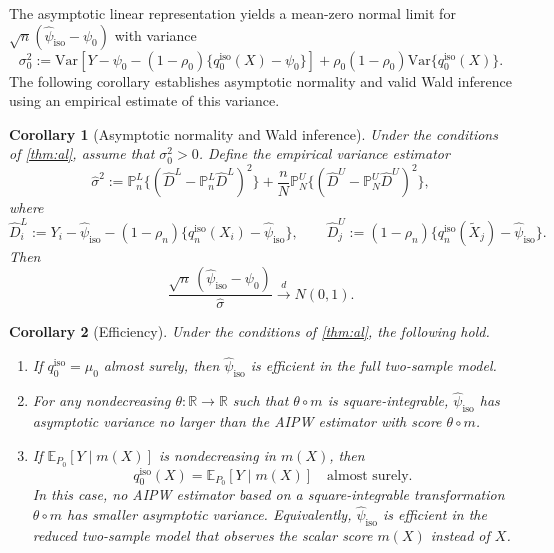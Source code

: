 \documentclass{article}
\theoremstyle{plain}
\newtheorem{corollary}{Corollary}
\theoremstyle{definition}
\newcommand{\E}{\mathbb{E}}
\newcommand{\Var}{\mathrm{Var}}
\newcommand{\1}{\mathbf{1}}
\newcommand{\mhat}{m}
\newcommand{\rhozero}{\rho_0}
\newcommand{\rhon}{\rho_n}
\newcommand{\muzero}{\mu_0}
\newcommand{\Pl}{\mathbb{P}^{L}_n}
\newcommand{\Pu}{\mathbb{P}^{U}_N}
\begin{document}
The asymptotic linear representation yields a mean-zero
normal limit for
$\sqrt n(\widehat{\psi}_{\mathrm{iso}}-\psi_0)$ with variance
\[
\sigma_0^2
:=
\Var\!\left[
Y-\psi_0-(1-\rhozero)\{q_0^{\mathrm{iso}}(X)-\psi_0\}
\right]
+
\rhozero(1-\rhozero)\Var\{q_0^{\mathrm{iso}}(X)\}.
\]
The following corollary establishes asymptotic normality
and valid Wald inference using an empirical estimate of
this variance.

\begin{corollary}[Asymptotic normality and Wald inference]
\label{cor:normal}
Under the conditions of \cref{thm:al}, assume that
$\sigma_0^2>0$. Define the empirical variance estimator
\[
\widehat \sigma^2
:=
\Pl\{(\widehat D^L-\Pl\widehat D^L)^2\}
+
\frac{n}{N}\Pu\{(\widehat D^U-\Pu\widehat D^U)^2\},
\]
where
\[
\widehat D_i^L
:=
Y_i-\widehat{\psi}_{\mathrm{iso}}
-(1-\rhon)\{q_n^{\mathrm{iso}}(X_i)-\widehat{\psi}_{\mathrm{iso}}\},
\qquad
\widehat D_j^U
:=
(1-\rhon)\{q_n^{\mathrm{iso}}(\widetilde X_j)-\widehat{\psi}_{\mathrm{iso}}\}.
\]
Then
\[
\frac{\sqrt n\,(\widehat{\psi}_{\mathrm{iso}}-\psi_0)}
{\widehat\sigma}
\overset{d}{\longrightarrow}
N(0,1).
\]
\end{corollary}

\begin{corollary}[Efficiency]
\label{cor:efficiency}
Under the conditions of \cref{thm:al}, the following hold.
\begin{enumerate}[leftmargin=6mm,label=(\roman*)]
\item If \(q_0^{\mathrm{iso}}=\muzero\) almost surely, then
\(\widehat{\psi}_{\mathrm{iso}}\) is efficient in the full two-sample model.
\item For any nondecreasing \(\theta:\mathbb R\to\mathbb R\) such that
\(\theta\circ m\) is square-integrable,
\(\widehat{\psi}_{\mathrm{iso}}\) has asymptotic variance no larger than the
AIPW estimator with score \(\theta\circ\mhat\).
\item If \(\E_{P_0}[Y\mid \mhat(X)]\) is nondecreasing in \(\mhat(X)\), then
\[
q_0^{\mathrm{iso}}(X)=\E_{P_0}[Y\mid \mhat(X)] \quad \text{almost surely}.
\]
In this case, no AIPW estimator based on a square-integrable transformation
\(\theta\circ\mhat\) has smaller asymptotic variance. Equivalently, \(\widehat{\psi}_{\mathrm{iso}}\)
is efficient in the reduced two-sample model that observes the scalar score
\(\mhat(X)\) instead of \(X\).
\end{enumerate}
\end{corollary}
\end{document}
